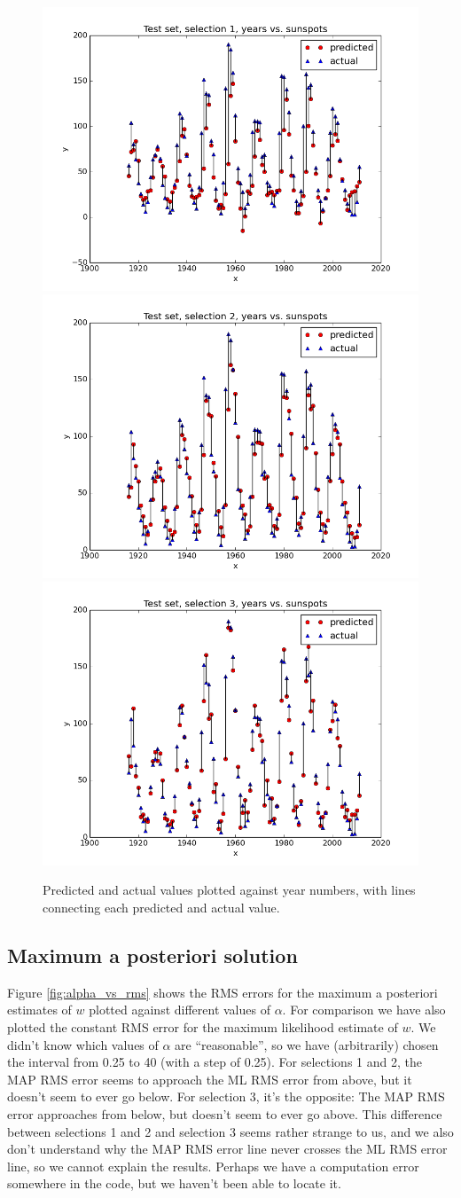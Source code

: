\documentclass[a4paper]{article}
\begin{document}
\begin{figure}[H]
  \begin{adjustwidth}{-7em}{-7em}
    \centering
    \includegraphics[width=.32\linewidth]{figures/years_vs_sunspots_selection1.png}
    \includegraphics[width=.32\linewidth]{figures/years_vs_sunspots_selection2.png}
    \includegraphics[width=.32\linewidth]{figures/years_vs_sunspots_selection3.png}
  \end{adjustwidth}
  \caption{Predicted and actual values plotted against year numbers, with lines connecting each predicted and actual value.}
  \label{fig:years_vs_sunspots}
\end{figure}

\subsection{Maximum a posteriori solution}
Figure \ref{fig:alpha_vs_rms} shows the RMS errors for the maximum a posteriori estimates of $w$ plotted against different values of $\alpha$. For comparison we have also plotted the constant RMS error for the maximum likelihood estimate of $w$. We didn't know which values of $\alpha$ are ``reasonable'', so we have (arbitrarily) chosen the interval from 0.25 to 40 (with a step of 0.25). For selections 1 and 2, the MAP RMS error seems to approach the ML RMS error from above, but it doesn't seem to ever go below. For selection 3, it's the opposite: The MAP RMS error approaches from below, but doesn't seem to ever go above. This difference between selections 1 and 2 and selection 3 seems rather strange to us, and we also don't understand why the MAP RMS error line never crosses the ML RMS error line, so we cannot explain the results. Perhaps we have a computation error somewhere in the code, but we haven't been able to locate it.
\end{document}
